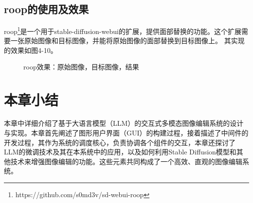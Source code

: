 \documentclass[a4paper,AutoFakeBold,oneside,12pt]{book}
\begin{document}
\subsection{roop的使用及效果}
roop\footnote{https://github.com/s0md3v/sd-webui-roop}是一个用于stable-diffusion-webui的扩展，提供面部替换的功能。这个扩展需要一张原始图像和目标图像，并能将原始图像的面部替换到目标图像上。
其实现的效果如图4-10。
\begin{figure}[!htbp]
    \centering
    \quad %
    \quad %
    \caption{roop效果：\protect{}原始图像，\protect{}目标图像，\protect{}结果} %
    \label{Fig:Roop} %
\end{figure}

\section{本章小结}
本章中详细介绍了基于大语言模型（LLM）的交互式多模态图像编辑系统的设计与实现。本章首先阐述了图形用户界面（GUI）的构建过程，接着描述了中间件的开发过程，其作为系统的调度核心，负责协调各个组件的交互，本章还探讨了LLM的微调技术及其在本系统中的应用，以及如何利用Stable Diffusion模型和其他技术来增强图像编辑的功能。这些元素共同构成了一个高效、直观的图像编辑系统。
\end{document}
